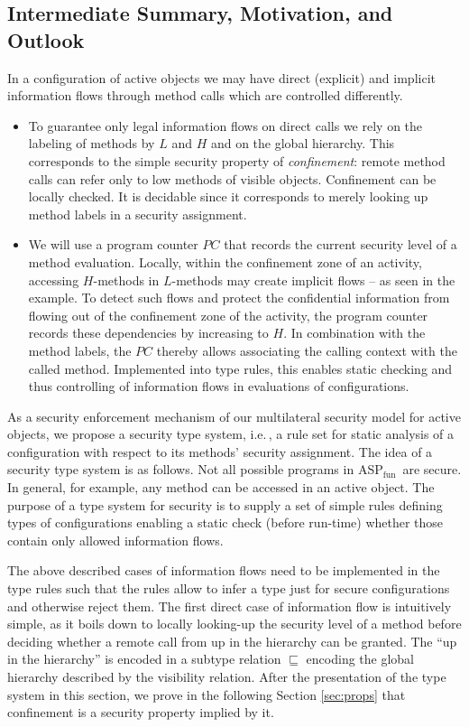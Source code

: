 \documentclass[10pt, conference, compsocconf]{IEEEtran}
\newcommand\aspfun{ASP${}_\text{fun}$\ }
\newcommand\ie{i.e.\!\,, }
\begin{document}
{\subsection{Intermediate Summary, Motivation, and Outlook}
\label{sec:typesmotiv}
In a configuration of active objects we may have direct (explicit) and implicit information flows
through method calls which are controlled differently.
\begin{itemize}
\item To guarantee only legal information flows on direct calls we rely on the labeling of
   methods by $L$ and $H$ and on the global hierarchy. This corresponds to the simple security
   property of {\it confinement}: remote method calls can refer only to low methods of visible objects. 
   Confinement can be locally checked. It is decidable since it corresponds to merely looking up 
   method labels in a security assignment. 
\item We will use a program counter $PC$ that records the current security level of a method evaluation. 
    Locally, within the confinement zone of an activity, 
accessing $H$-methods in $L$-methods may create implicit flows -- as seen in the example.
    To detect such flows and protect the confidential information from flowing out of the 
    confinement zone of the activity, the program counter records these dependencies by 
    increasing to $H$. In combination with the method labels, the $PC$ thereby allows 
    associating the calling context with the called method. Implemented into type rules,
    this enables static checking and thus controlling of information flows in evaluations 
    of configurations. 
\end{itemize}
As a security enforcement mechanism of our multilateral security model for active objects, 
we propose a security type system, \ie a rule set for static analysis of a configuration with respect
to its methods' security assignment. The idea of a security type system is as follows.
Not all possible programs in \aspfun are secure. In general, for example, any method can be accessed
in an active object. The purpose of a type system for security is to supply a set of simple rules defining
types of configurations enabling a static check (before run-time) whether those contain only allowed 
information flows.

The above described cases of information flows need to be implemented in the type rules such that the 
rules allow to infer a type just for secure configurations and otherwise reject them.
The first direct case of information flow is intuitively simple, as it boils down to locally looking-up 
the security level of a method before deciding whether a remote call from up in the hierarchy can be 
granted.
The ``up in the hierarchy'' is encoded in a subtype relation $\sqsubseteq$ encoding the global hierarchy
described by the visibility relation. After the presentation of the type system in this section, we 
prove in the following Section \ref{sec:props} that confinement is a security property implied by it.

}
\end{document}
